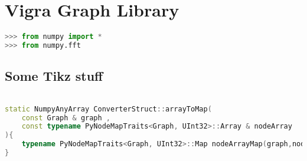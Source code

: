 \chapter{Vigra Graph Library} \label{ch:vigra_graph_lib}



\begin{lstlisting}[language=python]
>>> from numpy import *
>>> from numpy.fft
\end{lstlisting}
\section{Some Tikz stuff}




\begin{lstlisting}[language=c++]

static NumpyAnyArray ConverterStruct::arrayToMap(
    const Graph & graph , 
    const typename PyNodeMapTraits<Graph, UInt32>::Array & nodeArray
){
    typename PyNodeMapTraits<Graph, UInt32>::Map nodeArrayMap(graph,nodeArray)
}

\end{lstlisting}
